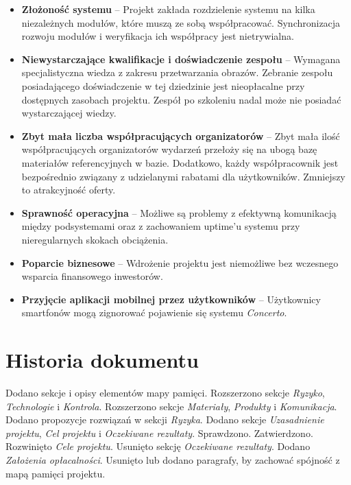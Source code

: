 \documentclass[10pt]{dokument-ppi}
\begin{document}
\begin{itemize}
    \item \textbf{Złożoność systemu} -- Projekt zakłada rozdzielenie systemu na
        kilka niezależnych modułów, które muszą ze sobą współpracować. Synchronizacja
        rozwoju modułów i weryfikacja ich współpracy jest nietrywialna.
    \item \textbf{Niewystarczające kwalifikacje i doświadczenie zespołu} --
        Wymagana specjalistyczna wiedza z zakresu przetwarzania obrazów. Zebranie
        zespołu posiadającego doświadczenie w tej dziedzinie jest nieopłacalne przy
        dostępnych zasobach projektu. Zespół po szkoleniu nadal może nie posiadać
        wystarczającej wiedzy.
    \item \textbf{Zbyt mała liczba współpracujących organizatorów} -- Zbyt mała
        ilość współpracujących organizatorów wydarzeń przełoży się na ubogą bazę
        materiałów referencyjnych w bazie. Dodatkowo, każdy współpracownik jest
        bezpośrednio związany z udzielanymi rabatami dla użytkowników. Zmniejszy to
        atrakcyjność oferty.
    \item \textbf{Sprawność operacyjna} -- Możliwe są problemy z efektywną
        komunikacją między podsystemami oraz z zachowaniem uptime'u systemu przy
        nieregularnych skokach obciążenia.
    \item \textbf{Poparcie biznesowe} -- Wdrożenie projektu jest niemożliwe bez
        wczesnego wsparcia finansowego inwestorów.
    \item \textbf{Przyjęcie aplikacji mobilnej przez użytkowników} -- Użytkownicy
        smartfonów mogą zignorować pojawienie się systemu \emph{Concerto}.
\end{itemize}


\newpage
\section*{Historia dokumentu}
\begin{versions}
        Dodano sekcje i opisy elementów mapy pamięci.
        Rozszerzono sekcje \emph{Ryzyko}, \emph{Technologie} i \emph{Kontrola}.
        Rozszerzono sekcje \emph{Materiały}, \emph{Produkty} i \emph{Komunikacja}.
        Dodano propozycje rozwiązań w sekcji \emph{Ryzyka}.
        Dodano sekcje \emph{Uzasadnienie projektu}, \emph{Cel projektu} i
        \emph{Oczekiwane rezultaty}.
        Sprawdzono.
        Zatwierdzono.
        Rozwinięto \emph{Cele projektu}. Usunięto sekcję \emph{Oczekiwane
        rezultaty}. Dodano \emph{Założenia opłacalności}.
        Usunięto lub dodano paragrafy, by zachować spójność z mapą pamięci
        projektu.
\end{versions}
\end{document}
